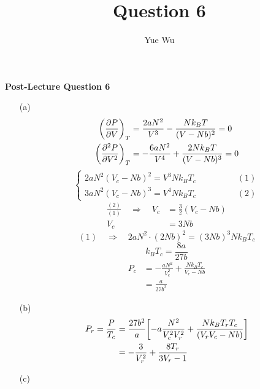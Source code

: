 \documentclass{article}
\title{Question 6}
\author{Yue Wu}
\begin{document}
    \begin{center}
        \LARGE\textbf{Post-Lecture Question 6}
    \end{center}

    \begin{enumerate}
        \item[(a)]
        \begin{align*}
            \qty(\pdv{P}{V})_T&=\frac{2aN^2}{V^3}-\frac{Nk_BT}{(V-Nb)^2}=0\\
            \qty(\pdv[2]{P}{V})_T&=-\frac{6aN^2}{V^4}+\frac{2Nk_BT}{(V-Nb)^3}=0
        \end{align*}
        $$\left\{\begin{aligned}
            2aN^2(V_c-Nb)^2=V^3Nk_BT_c & \qquad\qquad (1)\\
            3aN^2(V_c-Nb)^3=V^4Nk_BT_c & \qquad\qquad (2)
        \end{aligned}\right.$$
        \begin{align*}
            \frac{(2)}{(1)}\quad\Rightarrow\quad V_c&=\frac{3}{2}(V_c-Nb)\\
            V_c&=3Nb
        \end{align*}
        $$(1)\quad\Rightarrow\quad 2aN^2\cdot(2Nb)^2=(3Nb)^3Nk_BT_c$$
        $$k_BT_c=\frac{8a}{27b}$$
        \begin{align*}
            P_c&=-\frac{aN^2}{V_c^2}+\frac{Nk_BT_c}{V_c-Nb}\\
            &=\frac{a}{27b^2}
        \end{align*}
        \item[(b)]
        \begin{align*}
            P_r=\frac{P}{T_c}&=\frac{27b^2}{a}\qty[-a\frac{N^2}{V_c^2V_r^2}+\frac{Nk_BT_rT_c}{(V_rV_c-Nb)}]\\
            &=-\frac{3}{V_r^2}+\frac{8T_r}{3V_r-1}
        \end{align*}
        \item[(c)]$\,$
        

\end{enumerate}
\end{document}

